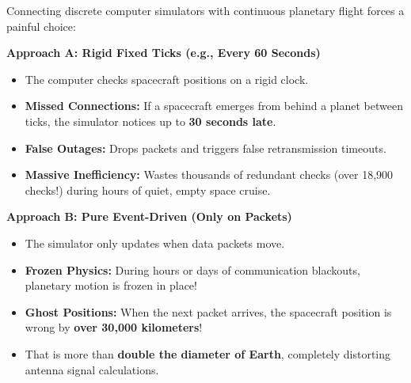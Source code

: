 \documentclass[9pt]{article}
\begin{document}
\begin{minipage}[t]{0.32\textwidth}
    \begin{tcolorbox}[posterbox, title=2. The Dilemma: Two Flawed Traditional Choices, height=15.2cm]
        Connecting discrete computer simulators with continuous planetary flight forces a painful choice:

        \vspace{2pt}
        \begin{tcolorbox}[colback=red!5, colframe=redAccent, boxrule=1pt, arc=3pt, left=4pt, right=4pt, top=3pt, bottom=3pt]
            {\color{redAccent}\textbf{Approach A: Rigid Fixed Ticks (e.g., Every 60 Seconds)}}
            \begin{itemize}[leftmargin=8pt, itemsep=2pt, topsep=1pt]
                \item The computer checks spacecraft positions on a rigid clock.
                \item \textbf{Missed Connections:} If a spacecraft emerges from behind a planet between ticks, the simulator notices up to \textbf{30 seconds late}.
                \item \textbf{False Outages:} Drops packets and triggers false retransmission timeouts.
                \item \textbf{Massive Inefficiency:} Wastes thousands of redundant checks (over 18,900 checks!) during hours of quiet, empty space cruise.
            \end{itemize}
        \end{tcolorbox}

        \vspace{2pt}
        \begin{tcolorbox}[amberbox]
            {\color{accentAmber}\textbf{Approach B: Pure Event-Driven (Only on Packets)}}
            \begin{itemize}[leftmargin=8pt, itemsep=2pt, topsep=1pt]
                \item The simulator only updates when data packets move.
                \item \textbf{Frozen Physics:} During hours or days of communication blackouts, planetary motion is frozen in place!
                \item \textbf{Ghost Positions:} When the next packet arrives, the spacecraft position is wrong by \textbf{over 30,000 kilometers}!
                \item That is more than \textbf{double the diameter of Earth}, completely distorting antenna signal calculations.
            \end{itemize}
        \end{tcolorbox}


\end{tcolorbox}
\end{minipage}
\end{document}
